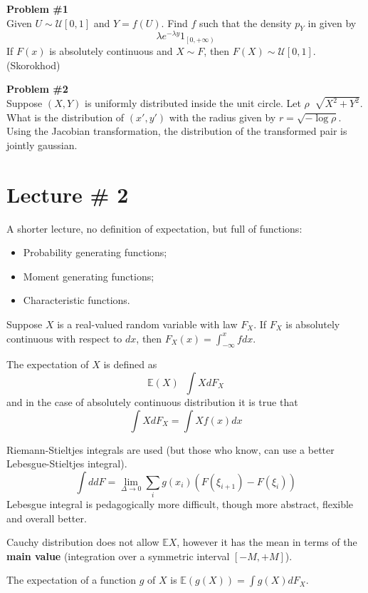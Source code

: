 \documentclass[a4paper]{article}
\newcommand{\clo}[1]{{\left [ #1 \right ]}}
\newcommand{\clop}[1]{{\left [ #1 \right )}}
\newcommand{\brac}[1]{{\left ( #1 \right )}}
\newcommand{\Ex}{\mathbb{E}}
\newcommand{\defn}{\mathop{\overset{\Delta}{=}}\nolimits}
\newcommand{\rus}[1]{\foreignlanguage{russian}{#1}}
\begin{document}
\noindent\textbf{Problem \#1}\hfill \\
	Given $U\sim \mathcal{U}\clo{0,1}$ and $Y=f(U)$. Find $f$ such that the density $p_Y$ in given by
	\[\lambda e^{-\lambda y} 1_{\clop{0,+\infty}}\]
	If $F(x)$ is absolutely continuous and $X\sim F$, then $F(X)\sim \mathcal{U}\clo{0,1}$. (Skorokhod)

\noindent\textbf{Problem \#2}\hfill \\
	Suppose $(X,Y)$ is uniformly distributed inside the unit circle. Let $\rho \defn \sqrt{X^2+Y^2}$. What is the distribution of $(x',y')$ with the radius given by $r = \sqrt{-\log \rho}$.
	Using the Jacobian transformation, the distribution of the transformed pair is jointly gaussian.


\section{Lecture \# 2} %
\label{sec:lecture_2}

A shorter lecture, no definition of expectation, but full of functions:
\begin{itemize}
	\item Probability generating functions;
	\item Moment generating functions;
	\item Characteristic functions.
\end{itemize}

Suppose $X$ is a real-valued random variable with law $F_X$. If $F_X$ is absolutely continuous with respect to $dx$, then $F_X(x) = \int_{-\infty}^x f dx$.

The expectation of $X$ is defined as \[\Ex(X) \defn \int X d{F_X}\] and in the case of absolutely continuous distribution it is true that \[\int X d{F_X} = \int X f(x) dx\]

Riemann-Stieltjes integrals are used (but those who know, can use a better Lebesgue-Stieltjes integral).
\[\int d dF = \lim_{\Delta\to 0} \sum_i g(x_i) \brac{F(\xi_{i+1}) - F(\xi_i)}\]
Lebesgue integral is pedagogically more difficult, though more abstract, flexible and overall better.

Cauchy distribution does not allow $\Ex X$, however it has the mean in terms of the \textbf{main value} (integration over a symmetric interval $\clo{-M,+M}$).

The expectation of a function $g$ of $X$ is $\Ex\brac{g(X)} = \int g(X) dF_X$.
\end{document}
